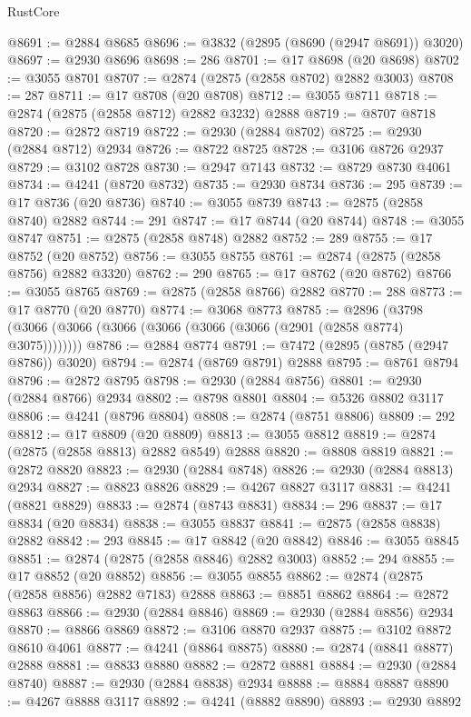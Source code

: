 \begin{lexlean}{RustCore}
\begin{coremodule}
@8691 := @2884 @8685
@8696 := @3832 (@2895 (@8690 (@2947 @8691)) @3020)
@8697 := @2930 @8696
@8698 := 286
@8701 := @17 @8698 (@20 @8698)
@8702 := @3055 @8701
@8707 := @2874 (@2875 (@2858 @8702) @2882 @3003)
@8708 := 287
@8711 := @17 @8708 (@20 @8708)
@8712 := @3055 @8711
@8718 := @2874 (@2875 (@2858 @8712) @2882 @3232) @2888
@8719 := @8707 @8718
@8720 := @2872 @8719
@8722 := @2930 (@2884 @8702)
@8725 := @2930 (@2884 @8712) @2934
@8726 := @8722 @8725
@8728 := @3106 @8726 @2937
@8729 := @3102 @8728
@8730 := @2947 @7143
@8732 := @8729 @8730 @4061
@8734 := @4241 (@8720 @8732)
@8735 := @2930 @8734
@8736 := 295
@8739 := @17 @8736 (@20 @8736)
@8740 := @3055 @8739
@8743 := @2875 (@2858 @8740) @2882
@8744 := 291
@8747 := @17 @8744 (@20 @8744)
@8748 := @3055 @8747
@8751 := @2875 (@2858 @8748) @2882
@8752 := 289
@8755 := @17 @8752 (@20 @8752)
@8756 := @3055 @8755
@8761 := @2874 (@2875 (@2858 @8756) @2882 @3320)
@8762 := 290
@8765 := @17 @8762 (@20 @8762)
@8766 := @3055 @8765
@8769 := @2875 (@2858 @8766) @2882
@8770 := 288
@8773 := @17 @8770 (@20 @8770)
@8774 := @3068 @8773
@8785 := @2896 (@3798 (@3066 (@3066 (@3066 (@3066 (@3066 (@3066 (@2901 (@2858 @8774) @3075))))))))
@8786 := @2884 @8774
@8791 := @7472 (@2895 (@8785 (@2947 @8786)) @3020)
@8794 := @2874 (@8769 @8791) @2888
@8795 := @8761 @8794
@8796 := @2872 @8795
@8798 := @2930 (@2884 @8756)
@8801 := @2930 (@2884 @8766) @2934
@8802 := @8798 @8801
@8804 := @5326 @8802 @3117
@8806 := @4241 (@8796 @8804)
@8808 := @2874 (@8751 @8806)
@8809 := 292
@8812 := @17 @8809 (@20 @8809)
@8813 := @3055 @8812
@8819 := @2874 (@2875 (@2858 @8813) @2882 @8549) @2888
@8820 := @8808 @8819
@8821 := @2872 @8820
@8823 := @2930 (@2884 @8748)
@8826 := @2930 (@2884 @8813) @2934
@8827 := @8823 @8826
@8829 := @4267 @8827 @3117
@8831 := @4241 (@8821 @8829)
@8833 := @2874 (@8743 @8831)
@8834 := 296
@8837 := @17 @8834 (@20 @8834)
@8838 := @3055 @8837
@8841 := @2875 (@2858 @8838) @2882
@8842 := 293
@8845 := @17 @8842 (@20 @8842)
@8846 := @3055 @8845
@8851 := @2874 (@2875 (@2858 @8846) @2882 @3003)
@8852 := 294
@8855 := @17 @8852 (@20 @8852)
@8856 := @3055 @8855
@8862 := @2874 (@2875 (@2858 @8856) @2882 @7183) @2888
@8863 := @8851 @8862
@8864 := @2872 @8863
@8866 := @2930 (@2884 @8846)
@8869 := @2930 (@2884 @8856) @2934
@8870 := @8866 @8869
@8872 := @3106 @8870 @2937
@8875 := @3102 @8872 @8610 @4061
@8877 := @4241 (@8864 @8875)
@8880 := @2874 (@8841 @8877) @2888
@8881 := @8833 @8880
@8882 := @2872 @8881
@8884 := @2930 (@2884 @8740)
@8887 := @2930 (@2884 @8838) @2934
@8888 := @8884 @8887
@8890 := @4267 @8888 @3117
@8892 := @4241 (@8882 @8890)
@8893 := @2930 @8892

\end{coremodule}
\end{lexlean}
